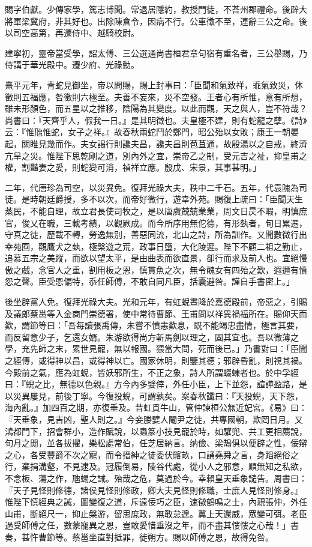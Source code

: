 \begin{pinyinscope}
賜字伯獻。少傳家學，篤志博聞。常退居隱約，教授門徒，不荅州郡禮命。後辟大將軍梁冀府，非其好也。出除陳倉令，因病不行。公車徵不至，連辭三公之命。後以司空高第，再遷侍中、越騎校尉。

建寧初，靈帝當受學，詔太傅、三公選通尚書桓君章句宿有重名者，三公舉賜，乃侍講于華光殿中。遷少府、光祿勳。

熹平元年，青蛇見御坐，帝以問賜，賜上封事曰：「臣聞和氣致祥，乖氣致災，休徵則五福應，咎徵則六極至。夫善不妄來，災不空發。王者心有所惟，意有所想，雖未形顏色，而五星以之推移，陰陽為其變度。以此而觀，天之與人，豈不符哉？尚書曰：『天齊乎人，假我一日。』是其明徵也。夫皇極不建，則有蛇龍之孽。《詩》云：『惟虺惟蛇，女子之祥。』故春秋兩蛇鬥於鄭門，昭公殆以女敗；康王一朝晏起，關睢見幾而作。夫女謁行則讒夫昌，讒夫昌則苞苴通，故殷湯以之自戒，終濟亢旱之災。惟陛下思乾剛之道，別內外之宜，崇帝乙之制，受元吉之祉，抑皇甫之權，割豔妻之愛，則蛇變可消，禎祥立應。殷戊、宋景，其事甚明。」

二年，代唐珍為司空，以災異免。復拜光祿大夫，秩中二千石。五年，代袁隗為司徒。是時朝廷爵授，多不以次，而帝好微行，遊幸外苑。賜復上疏曰：「臣聞天生蒸民，不能自理，故立君長使司牧之，是以唐虞兢兢業業，周文日昃不暇，明慎庶官，俊乂在職，三載考績，以觀厥成。而今所序用無佗德，有形埶者，旬日累遷，守真之徒，歷載不轉，勞逸無別，善惡同流，北山之詩，所為訓作。又聞數微行出幸苑囿，觀鷹犬之埶，極槃遊之荒，政事日墮，大化陵遲。陛下不顧二祖之勤止，追慕五宗之美蹤，而欲以望太平，是由曲表而欲直景，卻行而求及前人也。宜絕慢傲之戲，念官人之重，割用板之恩，慎貫魚之次，無令醜女有四殆之歎，遐邇有憤怨之聲。臣受恩偏特，忝任師傅，不敢自同凡臣，括囊避咎。謹自手書密上。」

後坐辟黨人免。復拜光祿大夫。光和元年，有虹蜺晝降於嘉德殿前，帝惡之，引賜及議郎蔡邕等入金商門崇德署，使中常待曹節、王甫問以祥異禍福所在。賜仰天而歎，謂節等曰：「吾每讀張禹傳，未嘗不憤恚歎息，既不能竭忠盡情，極言其要，而反留意少子，乞還女婿。朱游欲得尚方斬馬劍以理之，固其宜也。吾以微薄之學，充先師之末，累世見寵，無以報國。猥當大問，死而後已。」乃書對曰：「臣聞之經傳，或得神以昌，或得神以亡。國家休明，則鑒其德；邪辟昏亂，則視其禍。今殿前之氣，應為虹蜺，皆妖邪所生，不正之象，詩人所謂蝃蝀者也。於中孚經曰：『蜺之比，無德以色親。』方今內多嬖倖，外任小臣，上下並怨，諠譁盈路，是以災異屢見，前後丁寧。今復投蜺，可謂孰矣。案春秋讖曰：『天投蜺，天下怨，海內亂。』加四百之期，亦復垂及。昔虹貫牛山，管仲諫桓公無近妃宮。《易》曰：『天垂象，見吉凶，聖人則之。』今妾媵嬖人閹尹之徒，共專國朝，欺罔日月。又鴻都門下，招會群小，造作賦說，以蟲篆小技見寵於時，如驩兜、共工更相薦說，旬月之閒，並各拔擢，樂松處常伯，任芝居納言。纳儉、梁鵠俱以便辟之性，佞辯之心，各受豐爵不次之寵，而令搢紳之徒委伏髂畝，口誦堯舜之言，身蹈絕俗之行，棄捐溝壑，不見逮及。冠履倒易，陵谷代處，從小人之邪意，順無知之私欲，不念板、蕩之作，虺蜴之誡。殆哉之危，莫過於今。幸賴皇天垂象譴告。周書曰：『天子見怪則修德，諸侯見怪則修政，卿大夫見怪則修職，士庶人見怪則修身。』惟陛下慎經典之誡，圖變復之道，斥遠佞巧之臣，速徵鶴鳴之士，內親張仲，外任山甫，斷絕尺一，抑止槃游，留思庶政，無敢怠遑。冀上天還威，眾變可弭。老臣過受師傅之任，數蒙寵異之恩，豈敢愛惜垂沒之年，而不盡其慺慺之心哉！」書奏，甚忤曹節等。蔡邕坐直對抵罪，徙朔方。賜以師傅之恩，故得免咎。


\end{pinyinscope}
